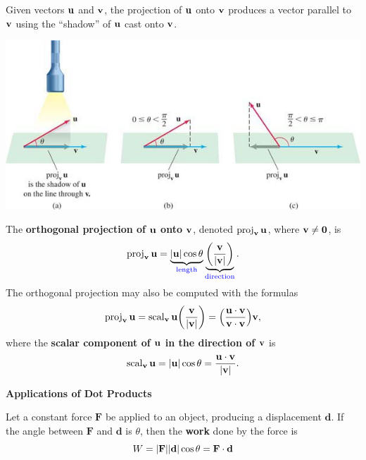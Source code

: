 \documentclass[mathNotesPreamble]{subfiles}
\begin{document}
  \noindent
  Given vectors ${\mathbf{u}}$ and ${\mathbf{v}}$, the projection of ${\mathbf{u}}$ onto ${\mathbf{v}}$ produces a vector parallel to ${\mathbf{v}}$ using the ``shadow'' of ${\mathbf{u}}$ cast onto ${\mathbf{v}}$.
  \begin{center}
    \includegraphics[width=0.9\linewidth]{images/briggs_13_03/fig13_47}
  \end{center}
  \begin{defn*}
    The \textbf{orthogonal projection of ${\mathbf{u}}$ onto ${\mathbf{v}}$}, denoted $\operatorname{proj}_{\mathbf{v}} {\mathbf{u}}$, where ${\mathbf{v}}\neq\mathbf{0}$, is
      \[\operatorname{proj}_{\mathbf{v}} {\mathbf{u}} =\underbrace{{\left\vert{\mathbf{u}}\right\vert}\cos\theta}_{\textnormal{\textcolor{blue}{length}}}\underbrace{{\left(\frac{{\mathbf{v}}}{{\left\vert{\mathbf{v}}\right\vert}}\right)}}_{\textnormal{\textcolor{blue}{direction}}}.\]
    The orthogonal projection may also be computed with the formulas
      \[\operatorname{proj}_{\mathbf{v}} {\mathbf{u}}=\operatorname{scal}_{\mathbf{v}} {\mathbf{u}}{\left(\frac{{\mathbf{v}}}{{\left\vert{\mathbf{v}}\right\vert}}\right)}={\left(\frac{{\mathbf{u}}\cdot{\mathbf{v}}}{{\mathbf{v}}\cdot{\mathbf{v}}}\right)}{\mathbf{v}},\]
    where the \textbf{scalar component of ${\mathbf{u}}$ in the direction of ${\mathbf{v}}$} is
      \[\operatorname{scal}_{\mathbf{v}} {\mathbf{u}}={\left\vert{\mathbf{u}}\right\vert}\cos\theta=\frac{{\mathbf{u}}\cdot{\mathbf{v}}}{{\left\vert{\mathbf{v}}\right\vert}}.\]
  \end{defn*}
  \pagebreak
  \textbf{Applications of Dot Products}

  \begin{defn*}[Work]
    Let a constant force $\mathbf{F}$ be applied to an object, producing a displacement $\mathbf{d}$. If the angle between $\mathbf{F}$ and $\mathbf{d}$ is $\theta$, then the \textbf{work} done by the force is
      \[W={\left\vert\mathbf{F}\right\vert}{\left\vert\mathbf{d}\right\vert}\cos\theta=\mathbf{F}\cdot \mathbf{d}\]
  \end{defn*}
  \begin{ex*}
    
  \end{ex*}
  
\end{document}
